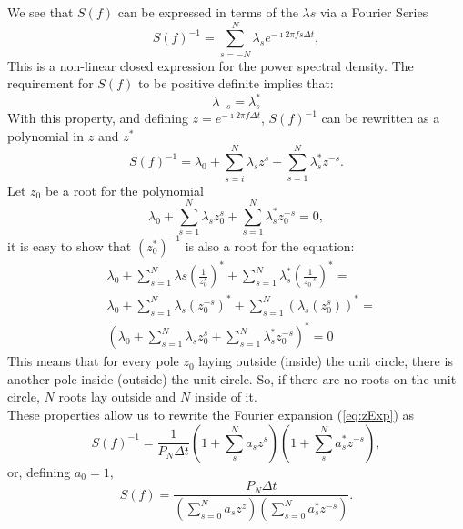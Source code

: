 \documentclass[twocolumn,showpacs,preprintnumbers,nofootinbib,prd,
superscriptaddress,10pt]{revtex4-1}
\begin{document}
We see that $S(f)$ can be expressed in terms of the $\lambda s$ via a Fourier Series
\begin{equation}\label{eq:PSDconstraint}
    S(f)^{-1} = \sum_{s = -N}^N \lambda_s e^{-\imath 2 \pi f s \Delta t},
\end{equation}
This is a non-linear closed expression for the power spectral density. The requirement for $S(f)$ to be positive definite implies that: 
\begin{equation}
    \nonumber 
    \lambda_{-s} = \lambda_s^* 
\end{equation}
With this property, and defining $z = e^{-\imath 2 \pi f \Delta t}$, $S(f)^{-1}$ can be rewritten as a polynomial in $z$ and $z^*$
\begin{equation}
    \label{eq:zExp}
    S(f)^{-1} = \lambda_0 + \sum_{s = i}^N \lambda_s z^s + \sum_{s = 1}^N \lambda^*_s z^{-s}.
\end{equation}
Let $z_0$ be a root for the polynomial
\begin{equation}
    \nonumber
    \lambda_0 + \sum_{s = 1}^N \lambda_s z_0^s + \sum_{s = 1}^N \lambda^*_s z_0^{-s} = 0,
\end{equation}
it is easy to show that $(z_0^*)^{-1}$ is also a root for the equation: 
\begin{align}
    \nonumber 
    &\lambda_0 + \sum_{s = 1}^{N} \lambda s \left(\frac{1}{z_0^s} \right)^* + \sum_{s = 1}^N \lambda^*_s \left(\frac{1 }{z_0^{-s}}\right)^* = \\ \nonumber 
    &\lambda_0 + \sum_{s = 1}^N \lambda_s (z_0^{-s})^* + \sum_{s=1}^N \left(\lambda_s (z_0^s)\right)^* = \\ \nonumber 
    &\left(\lambda_0 + \sum_{s=1}^N \lambda_s z_0^s + \sum_{s = 1}^N \lambda^*_s z_0^{-s}\right)^* = 0 
\end{align}
This means that for every pole $z_0$ laying outside (inside) the unit circle, there is another pole inside (outside) the unit circle.  So, if there are no roots on the unit circle, $N$ roots lay outside and $N$ inside of it. \\ 
These properties allow us to rewrite the Fourier expansion (\ref{eq:zExp}) as \cite{1975STIN...7714318B}
\begin{equation}\nonumber 
    S(f)^{-1} = \frac{1}{P_N \Delta t} \left(1 + \sum_{s}^N a_s z^s\right)\left(1 + \sum_s^N  a^*_s z^{-s}\right),
\end{equation}
or, defining $a_0 = 1$,
\begin{equation}\label{eq:MESApsd_appendix}
    S(f) = \frac{P_N \Delta t}{\left(\sum_{s=0}^N a_s z^z\right)\left(\sum_{s = 0}^N a^*_s z^{-s}\right)}. 
\end{equation}
\end{document}
